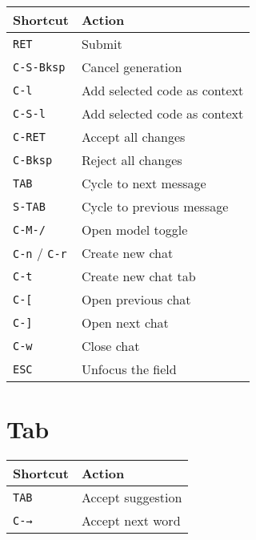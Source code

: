 \documentclass[10pt,landscape]{article}
\newcommand{\key}[1]{\textcolor{keycolor}{\texttt{#1}}}
\begin{document}
\begin{multicols}{2}
\begin{tabular}{@{}p{3cm}p{6.5cm}@{}}
\toprule
\textbf{Shortcut} & \textbf{Action} \\
\midrule
\key{RET} & Submit \\
\key{C-S-Bksp} & Cancel generation \\
\key{C-l} & Add selected code as context \\
\key{C-S-l} & Add selected code as context \\
\key{C-RET} & Accept all changes \\
\key{C-Bksp} & Reject all changes \\
\key{TAB} & Cycle to next message \\
\key{S-TAB} & Cycle to previous message \\
\key{C-M-/} & Open model toggle \\
\key{C-n} / \key{C-r} & Create new chat \\
\key{C-t} & Create new chat tab \\
\key{C-[} & Open previous chat \\
\key{C-]} & Open next chat \\
\key{C-w} & Close chat \\
\key{ESC} & Unfocus the field \\
\bottomrule
\end{tabular}



\section*{\textcolor{sectioncolor}{Tab}}

\begin{tabular}{@{}p{3cm}p{6.5cm}@{}}
\toprule
\textbf{Shortcut} & \textbf{Action} \\
\midrule
\key{TAB} & Accept suggestion \\
\key{C-→} & Accept next word \\
\bottomrule
\end{tabular}


\end{multicols}
\end{document}
